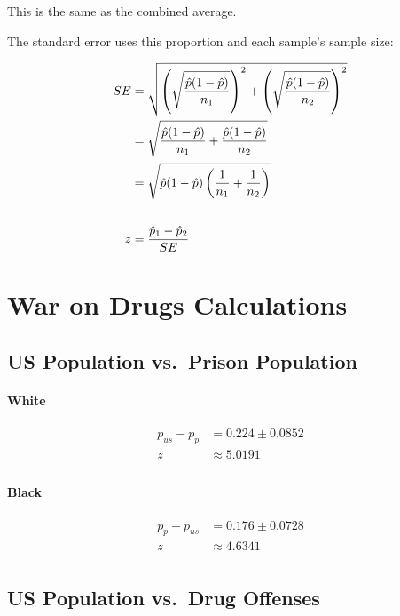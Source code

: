 \documentclass[letterpaper, landscape]{exam}
\begin{document}
  This is the same as the combined average. 

  The standard error uses this proportion and each sample's sample size:

  \begin{align*}
    SE & = \sqrt{ \del{ \sqrt{ \frac{\hat{p} ( 1 - \hat{p} )}{ n_1 } } }^2
               + \del{ \sqrt{ \frac{\hat{p} ( 1 - \hat{p} )}{ n_2 } } }^2} \\
       & = \sqrt{ \frac{\hat{p} ( 1 - \hat{p} )}{ n_1 } 
               + \frac{\hat{p} ( 1 - \hat{p} )}{ n_2 } } \\
       & = \sqrt{ \hat{p} ( 1 - \hat{p} ) \del{ \frac{1}{n_1} + \frac{1}{n_2} } } \\
    \\
    z  & = \frac{\hat{p}_1 - \hat{p}_2}{SE} \\
  \end{align*}
  
  \section{War on Drugs Calculations} %

  \subsection{US Population vs.\ Prison Population} %

  \paragraph{White} %
  \begin{align*}
    p_{us} - p_p & = 0.224 \pm 0.0852 \\
    z            & \approx 5.0191 \\
  \end{align*}
  
  \paragraph{Black} %
  \begin{align*}
    p_p - p_{us} & = 0.176 \pm 0.0728 \\
    z            & \approx 4.6341 \\
  \end{align*}
  
  \subsection{US Population vs.\ Drug Offenses} %
\end{document}
